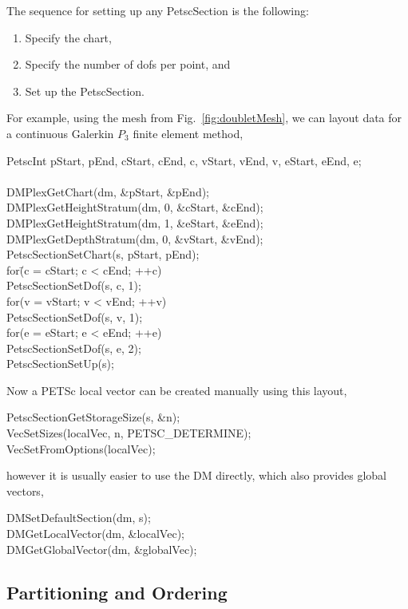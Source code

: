 {{{The sequence for setting up any PetscSection is the following:
\begin{enumerate}
  \item Specify the chart,
  \item Specify the number of dofs per point, and
  \item Set up the PetscSection.
\end{enumerate}
For example, using the mesh from Fig.~\ref{fig:doubletMesh}, we can layout data for a continuous Galerkin $P_3$ finite
element method,
\begin{tabbing}
  PetscInt pStart, pEnd, cStart, cEnd, c, vStart, vEnd, v, eStart, eEnd, e;\\
\\
  DMPlexGetChart(dm, \&pStart, \&pEnd);\\
  DMPlexGetHeightStratum(dm, 0, \&cStart, \&cEnd);\\
  DMPlexGetHeightStratum(dm, 1, \&eStart, \&eEnd);\\
  DMPlexGetDepthStratum(dm, 0, \&vStart, \&vEnd);\\
  PetscSectionSetChart(s, pStart, pEnd);\\
  for\=(c = cStart; c < cEnd; ++c)\\
    \>PetscSectionSetDof(s, c, 1);\\
  for(v = vStart; v < vEnd; ++v)\\
    \>PetscSectionSetDof(s, v, 1);\\
  for(e = eStart; e < eEnd; ++e)\\
    \>PetscSectionSetDof(s, e, 2);\\
  PetscSectionSetUp(s);
\end{tabbing}
Now a PETSc local vector can be created manually using this layout,
\begin{tabbing}
  PetscSectionGetStorageSize(s, \&n);\\
  VecSetSizes(localVec, n, PETSC_DETERMINE);\\
  VecSetFromOptions(localVec);
\end{tabbing}
however it is usually easier to use the DM directly, which also provides global vectors,
\begin{tabbing}
  DMSetDefaultSection(dm, s);\\
  DMGetLocalVector(dm, \&localVec);\\
  DMGetGlobalVector(dm, \&globalVec);
\end{tabbing}

\subsection{Partitioning and Ordering}

}}}
